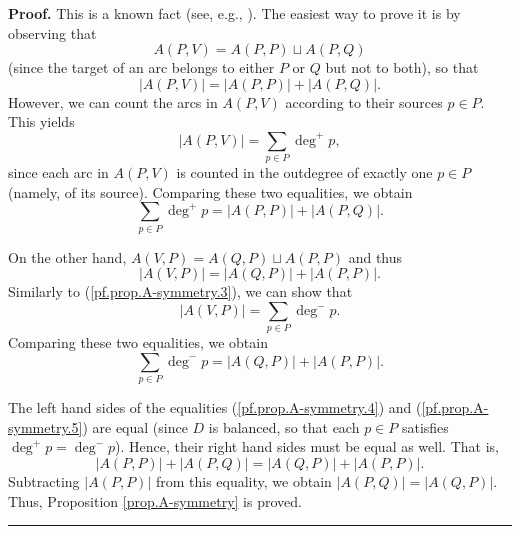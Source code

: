\documentclass[numbers=enddot,12pt,final,onecolumn,notitlepage]{scrartcl}%
\theoremstyle{definition}
\newenvironment{proof}[1][Proof]{\noindent\textbf{#1.} }{\ \rule{0.5em}{0.5em}}
\let\sumnonlimits\sum
\renewcommand{\sum}{\sumnonlimits\limits}
\theoremstyle{plainsl}
\begin{document}
\begin{proof}
This is a known fact (see, e.g., \cite[Exercise 9.1]{22s}). The easiest way to
prove it is by observing that%
\[
A\left(  P,V\right)  =A\left(  P,P\right)  \sqcup A\left(  P,Q\right)
\]
(since the target of an arc belongs to either $P$ or $Q$ but not to both), so
that%
\[
\left\vert A\left(  P,V\right)  \right\vert =\left\vert A\left(  P,P\right)
\right\vert +\left\vert A\left(  P,Q\right)  \right\vert .
\]
However, we can count the arcs in $A\left(  P,V\right)  $ according to their
sources $p\in P$. This yields%
\begin{equation}
\left\vert A\left(  P,V\right)  \right\vert =\sum_{p\in P}\deg^{+}p,
\label{pf.prop.A-symmetry.3}%
\end{equation}
since each arc in $A\left(  P,V\right)  $ is counted in the outdegree of
exactly one $p\in P$ (namely, of its source). Comparing these two equalities,
we obtain%
\begin{equation}
\sum_{p\in P}\deg^{+}p=\left\vert A\left(  P,P\right)  \right\vert +\left\vert
A\left(  P,Q\right)  \right\vert . \label{pf.prop.A-symmetry.4}%
\end{equation}


\noindent On the other hand, $A\left(  V,P\right)  =A\left(  Q,P\right)  \sqcup A\left(
P,P\right)  $ and thus%
\[
\left\vert A\left(  V,P\right)  \right\vert =\left\vert A\left(  Q,P\right)
\right\vert +\left\vert A\left(  P,P\right)  \right\vert .
\]
Similarly to (\ref{pf.prop.A-symmetry.3}), we can show that%
\[
\left\vert A\left(  V,P\right)  \right\vert =\sum_{p\in P}\deg^{-}p.
\]
Comparing these two equalities, we obtain%
\begin{equation}
\sum_{p\in P}\deg^{-}p=\left\vert A\left(  Q,P\right)  \right\vert +\left\vert
A\left(  P,P\right)  \right\vert . \label{pf.prop.A-symmetry.5}%
\end{equation}


The left hand sides of the equalities (\ref{pf.prop.A-symmetry.4}) and
(\ref{pf.prop.A-symmetry.5}) are equal (since $D$ is balanced, so that each
$p\in P$ satisfies $\deg^{+}p=\deg^{-}p$). Hence, their right hand sides must
be equal as well. That is,%
\[
\left\vert A\left(  P,P\right)  \right\vert +\left\vert A\left(  P,Q\right)
\right\vert =\left\vert A\left(  Q,P\right)  \right\vert +\left\vert A\left(
P,P\right)  \right\vert .
\]
Subtracting $\left\vert A\left(  P,P\right)  \right\vert $ from this equality,
we obtain $\left\vert A\left(  P,Q\right)  \right\vert =\left\vert A\left(
Q,P\right)  \right\vert $. Thus, Proposition \ref{prop.A-symmetry} is proved.
\end{proof}
\end{document}
